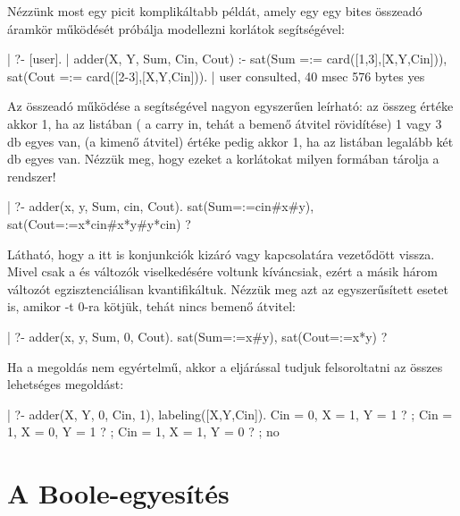 Nézzünk most egy picit komplikáltabb \clpb példát, amely egy egy bites
összeadó áramkör működését próbálja modellezni \clpb korlátok segítségével:

\begin{prologcode}
| ?- [user].
| adder(X, Y, Sum, Cin, Cout) :-
     sat(Sum =:= card([1,3],[X,Y,Cin])),
     sat(Cout =:= card([2-3],[X,Y,Cin])).
| {user consulted, 40 msec 576 bytes}
yes
\end{prologcode}

Az összeadó működése a  segítségével nagyon egyszerűen leírható:
az összeg értéke akkor 1, ha az \cd{[X,Y,Cin]} listában ( a carry in,
tehát a bemenő átvitel rövidítése) 1 vagy 3 db egyes van, 
(a kimenő átvitel) értéke pedig akkor 1, ha az \cd{[X,Y,Cin]} listában legalább
két db egyes van. Nézzük meg, hogy ezeket a korlátokat milyen formában tárolja
a \clpb rendszer!

\begin{prologcode}
| ?- adder(x, y, Sum, cin, Cout).
sat(Sum=:=cin#x#y),
sat(Cout=:=x*cin#x*y#y*cin) ?
\end{prologcode}

Látható, hogy a  itt is konjunkciók kizáró vagy kapcsolatára
vezetődött vissza. Mivel csak a  és  változók viselkedésére
voltunk kíváncsiak, ezért a másik három változót egzisztenciálisan
kvantifikáltuk. Nézzük meg azt az egyszerűsített esetet is, amikor -t
0-ra kötjük, tehát nincs bemenő átvitel:

\begin{prologcode}
| ?- adder(x, y, Sum, 0, Cout).
sat(Sum=:=x#y),
sat(Cout=:=x*y) ?
\end{prologcode}

Ha a megoldás nem egyértelmű, akkor a  eljárással tudjuk
felsoroltatni az összes lehetséges megoldást:

\begin{prologcode}
| ?- adder(X, Y, 0, Cin, 1), labeling([X,Y,Cin]).
Cin = 0, X = 1, Y = 1 ? ; 
Cin = 1, X = 0, Y = 1 ? ;
Cin = 1, X = 1, Y = 0 ? ;
no
\end{prologcode}

\section{A Boole-egyesítés}

